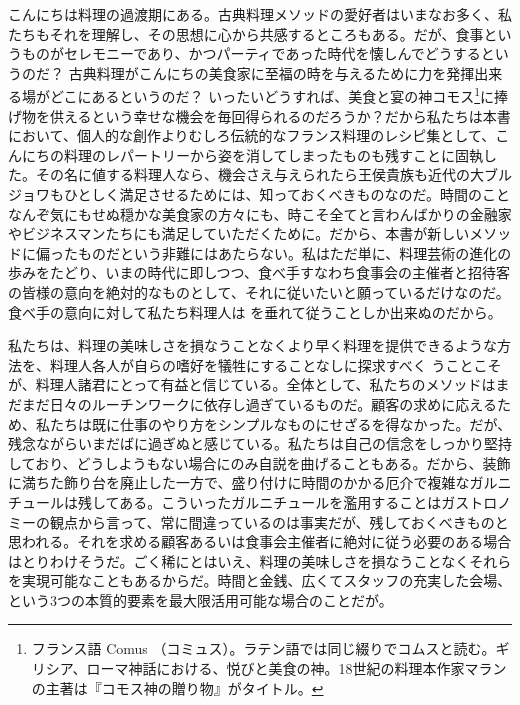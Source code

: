 こんにちは料理の過渡期にある。古典料理メソッドの愛好者はいまなお多く、私たちもそれを理解し、その思想に心から共感するところもある。だが、食事というものがセレモニーであり、かつパーティであった時代を懐しんでどうするというのだ？
古典料理がこんにちの美食家に至福の時を与えるために力を発揮出来る場がどこにあるというのだ？
いったいどうすれば、美食と宴の神コモス\footnote{フランス語 Comus
  （コミュス）。ラテン語では同じ綴りでコムスと読む。ギリシア、ローマ神話における、悦びと美食の神。18世紀の料理本作家マランの主著は『コモス神の贈り物』がタイトル。}に捧げ物を供えるという幸せな機会を毎回得られるのだろうか？だから私たちは本書において、個人的な創作よりむしろ伝統的なフランス料理のレシピ集として、こんにちの料理のレパートリーから姿を消してしまったものも残すことに固執した。その名に値する料理人なら、機会さえ与えられたら王侯貴族も近代の大ブルジョワもひとしく満足させるためには、知っておくべきものなのだ。時間のことなんぞ気にもせぬ穏かな美食家の方々にも、時こそ全てと言わんばかりの金融家やビジネスマンたちにも満足していただくために。だから、本書が新しいメソッドに偏ったものだという非難にはあたらない。私はただ単に、料理芸術の進化の歩みをたどり、いまの時代に即しつつ、食べ手すなわち食事会の主催者と招待客の皆様の意向を絶対的なものとして、それに従いたいと願っているだけなのだ。食べ手の意向に対して私たち料理人は
を垂れて従うことしか出来ぬのだから。

私たちは、料理の美味しさを損なうことなくより早く料理を提供できるような方法を、料理人各人が自らの嗜好を犠牲にすることなしに探求すべく
うことこそが、料理人諸君にとって有益と信じている。全体として、私たちのメソッドはまだまだ日々のルーチンワークに依存し過ぎているものだ。顧客の求めに応えるため、私たちは既に仕事のやり方をシンプルなものにせざるを得なかった。だが、残念ながらいまだばに過ぎぬと感じている。私たちは自己の信念をしっかり堅持しており、どうしようもない場合にのみ自説を曲げることもある。だから、装飾に満ちた飾り台を廃止した一方で、盛り付けに時間のかかる厄介で複雑なガルニチュールは残してある。こういったガルニチュールを濫用することはガストロノミーの観点から言って、常に間違っているのは事実だが、残しておくべきものと思われる。それを求める顧客あるいは食事会主催者に絶対に従う必要のある場合はとりわけそうだ。ごく稀にとはいえ、料理の美味しさを損なうことなくそれらを実現可能なこともあるからだ。時間と金銭、広くてスタッフの充実した会場、という3つの本質的要素を最大限活用可能な場合のことだが。

